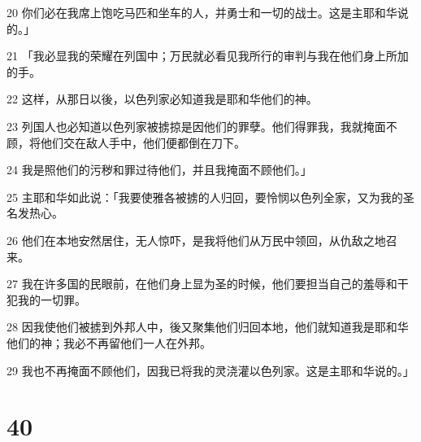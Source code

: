 \par 20 你们必在我席上饱吃马匹和坐车的人，并勇士和一切的战士。这是主耶和华说的。」
\par 21 「我必显我的荣耀在列国中；万民就必看见我所行的审判与我在他们身上所加的手。
\par 22 这样，从那日以後，以色列家必知道我是耶和华他们的神。
\par 23 列国人也必知道以色列家被掳掠是因他们的罪孽。他们得罪我，我就掩面不顾，将他们交在敌人手中，他们便都倒在刀下。
\par 24 我是照他们的污秽和罪过待他们，并且我掩面不顾他们。」
\par 25 主耶和华如此说：「我要使雅各被掳的人归回，要怜悯以色列全家，又为我的圣名发热心。
\par 26 他们在本地安然居住，无人惊吓，是我将他们从万民中领回，从仇敌之地召来。
\par 27 我在许多国的民眼前，在他们身上显为圣的时候，他们要担当自己的羞辱和干犯我的一切罪。
\par 28 因我使他们被掳到外邦人中，後又聚集他们归回本地，他们就知道我是耶和华他们的神；我必不再留他们一人在外邦。
\par 29 我也不再掩面不顾他们，因我已将我的灵浇灌以色列家。这是主耶和华说的。」

\chapter{40}

